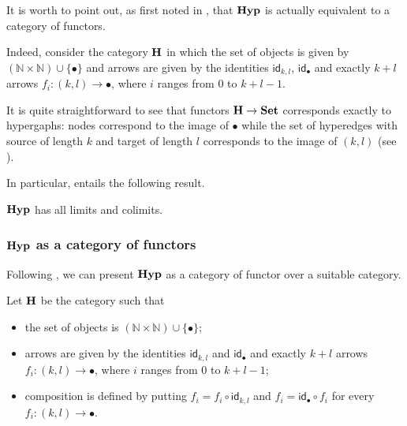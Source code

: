 \documentclass[a4paper,UKenglish,cleveref,pdftex,thm-restate,numberwithinsect]{lipics-v2021}
\newcommand{\Set}{\mathbf{Set}}
\newcommand{\catname}[1]{\textbf{\textup{#1}}}
\newcommand{\hyp}{\catname{Hyp}}
\newcommand{\id}[1]{\mathsf{id}_{#1}}
\begin{document}
\begin{remark}\label{rem:functor}
	It is worth to point out, as first noted in \cite{bonchi2022string}, that $\hyp$ is actually equivalent to a category of functors. 
	
	Indeed, consider the category $\catname{H}$ in which the set of objects is given by $ (\mathbb{N}\times \mathbb{N}) \cup \{\bullet\}$ and arrows are given by the identities $\id{k,l}$, $\id{\bullet}$ and exactly $k+l$ arrows $f_i\colon (k,l)\rightarrow \bullet$, where $i$ ranges from $0$ to $k+l-1$. 
	
	It is quite straightforward to see that functors $\catname{H}\to \Set$ corresponds exactly to hypergaphs: nodes correspond to the image of $\bullet$ while the set of hyperedges with source of length $k$ and target of length $l$ corresponds to the image of $(k,l)$ (see \cite{CastelnovoGM24}).
\end{remark}

In particular,  entails the following result. 

\begin{proposition}\label{prop:cocomp}
	$\hyp$ has all limits and colimits.
\end{proposition}

\iffalse
\subsubsection{$\hyp$ as a category of functors}

Following \cite{bonchi2022string}, we can present $\hyp$ as a category of functor over a suitable category.

\begin{definition}Let $\catname{H}$ be the category such that
	\begin{itemize}
		\item the set of objects is $ (\mathbb{N}\times \mathbb{N}) \cup \{\bullet\}$;
		\item arrows are given by the identities $\id{k,l}$ and $\id{\bullet}$ and exactly $k+l$ arrows $f_i\colon (k,l)\rightarrow \bullet$, where $i$ ranges from $0$ to $k+l-1$;
		\item composition is defined by putting
			$f_i=f_i\circ \id{k,l}$ and $f_i = \id{\bullet}\circ f_i$
		for every $f_i\colon (k,l)\rightarrow \bullet$.
	\end{itemize}
\end{definition}
\end{document}
